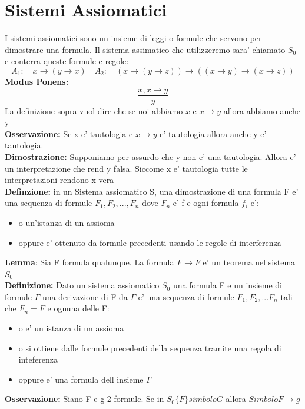 \documentclass{article}
\begin{document}
        \section{Sistemi Assiomatici}
        \begin{flushleft}
         I sistemi assiomatici sono un insieme di leggi o formule che servono per dimostrare una formula. Il sistema assimatico che
          utilizzeremo sara' chiamato $S_0$ e conterra queste formule e regole:
          \begin{equation}
            A_1: \quad x\to (y\to x) \quad A_2: \quad (x\to (y \to z)) \to ((x\to y)\to (x \to z))
          \end{equation}
          \textbf{Modus Ponens:}
          \begin{equation}
            \frac{x,x \to y}{y} 
          \end{equation}
          La definizione sopra vuol dire che se noi abbiamo $x$ e $x\to y$ allora abbiamo anche y \\
          \textbf{Osservazione:} Se x e' tautologia e $x \to y$ e' tautologia allora anche y e' tautologia. \\ 
          \textbf{Dimostrazione:} Supponiamo per assurdo che y non e' una tautologia. Allora e' un interpretazione che rend y falsa.
          Siccome x e' tautologia tutte le interpretazioni rendono x vera\\ 
          \textbf{Definzione:} in un Sistema assiomatico S, una dimostrazione di una formula F e' una sequenza di formule $F_1,F_2,...,F_n$ dove $F_n$
          e' f e ogni formula $f_i$ e':
          \begin{itemize}
            \item o un'istanza di un assioma
            \item oppure e' ottenuto da formule precedenti usando le regole di interferenza
          \end{itemize}
          \textbf{Lemma}: Sia F formula qualunque. La formula $F\to F$ e' un teorema nel sistema $S_0$ \\ 
          \textbf{Definizione:} Dato un sistema assiomatico $S_0$ una formula F e un insieme di formule $\Gamma$ una derivazione di F da $\Gamma$
          e' una sequenza di formule $F_1,F_2,...F_n$ tali che $F_n=F$ e ognuna delle F:
          \begin{itemize}
            \item o e' un istanza di un assioma
            \item o si ottiene dalle formule precedenti della sequenza tramite una regola di inteferenza
            \item oppure e' una formula dell insieme $\Gamma$
          \end{itemize}
          \textbf{Osservazione:} Siano F e g 2 formule. Se in $S_0 \{F \} simbolo G$ allora $SimboloF\to g$
        \end{flushleft}
\end{document}
